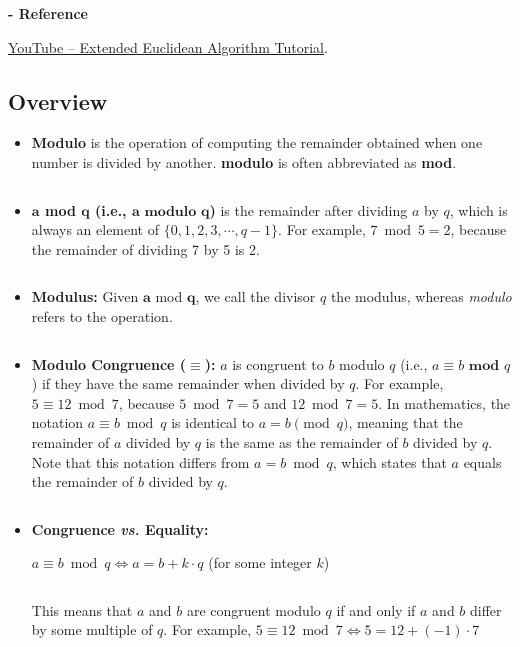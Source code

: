 
\noindent \textbf{- Reference} 

\href{https://www.youtube.com/watch?v=fz1vxq5ts5I}{YouTube -- Extended Euclidean Algorithm Tutorial}.


\subsection{Overview}
\label{subsec:modulo-overview} 

\begin{tcolorbox}[title={\textbf{\tboxdef{\ref*{subsec:modulo-overview}} Integer Modulo}}]

\begin{itemize}

\item \textbf{Modulo} is the operation of computing the remainder obtained when one number is divided by another. \textbf{modulo} is often abbreviated as \textbf{mod}.

$ $

\item \textbf{$\bm{a}$ mod $\bm{q}$ (i.e., $\bm{a} \bm{\text{ modulo } q}$)} is the remainder after dividing $a$ by $q$, which is always an element of $\{0, 1, 2, 3, \cdots, q-1\}$. For example, $7 \bmod 5 = 2$, because the remainder of dividing 7 by 5 is 2. 

$ $

\item \textbf{Modulus:} Given $\bm{a}$ mod $\bm{q}$, we call the divisor $q$ the modulus, whereas \emph{modulo} refers to the operation.

$ $

\item \textbf{Modulo Congruence ($\bm{\equiv}$):} $a$ is congruent to $b$ modulo $q$ (i.e., $a \equiv b \textbf{ mod } q$) if they have the same remainder when divided by $q$. For example, $5 \equiv 12 \bmod 7$, because $5 \bmod 7 = 5$ and $12 \bmod 7 = 5$. In mathematics, the notation $a \equiv b \bmod q$ is identical to $a = b \pmod q$, meaning that the remainder of $a$ divided by $q$ is the same as the remainder of $b$ divided by $q$. Note that this notation differs from $a = b \bmod q$, which states that $a$ equals the remainder of $b$ divided by $q$.

$ $

\item \textbf{Congruence \textit{vs.} Equality:} 

$a \equiv b \bmod q \Longleftrightarrow a = b + k\cdot q$ \text{ } (for some integer $k$)

$ $

This means that $a$ and $b$ are congruent modulo $q$ if and only if $a$ and $b$ differ by some multiple of $q$. For example, $5 \equiv 12 \bmod 7 \Longleftrightarrow 5 = 12 + (-1)\cdot 7$

\end{itemize}

\end{tcolorbox}



